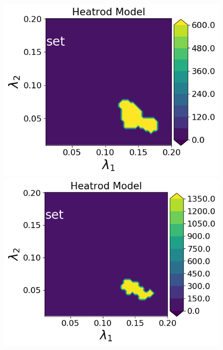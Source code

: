 \begin{figure}[h]
\begin{minipage}{.4\textwidth}
\includegraphics[width=\linewidth]{examples/fig_heatrod_q1/HeatrodModel--set_N50_em.png}
\includegraphics[width=\linewidth]{examples/fig_heatrod_q1/HeatrodModel--set_N500_em.png}


\end{minipage}
\end{figure}
